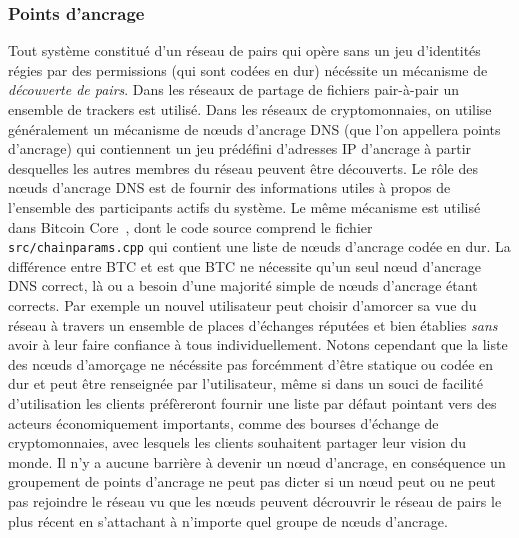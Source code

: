 \documentclass[runningheads,francais,a4paper]{llncs}
\begin{document}
\subsubsection{Points d'ancrage}
Tout système constitué d'un réseau de pairs qui opère sans un jeu d'identités régies par des permissions (qui sont
codées en dur) nécéssite un mécanisme de \emph{découverte de pairs}. Dans les réseaux de partage de fichiers pair-à-pair
un ensemble de trackers est utilisé. Dans les réseaux de cryptomonnaies, on utilise généralement un mécanisme de nœuds
d'ancrage DNS (que l'on appellera points d'ancrage) qui contiennent un jeu prédéfini d'adresses IP d'ancrage à partir
desquelles les autres membres du réseau peuvent être découverts. Le rôle des nœuds d'ancrage DNS est de fournir des
informations utiles à propos de l'ensemble des participants actifs du système. Le même mécanisme est utilisé dans
Bitcoin Core~\cite{bitcoin_2018}, dont le code source comprend le fichier \texttt{src/chainparams.cpp} qui contient
une liste de nœuds d'ancrage codée en dur. La différence entre BTC et \AVAPlatformName{} est que BTC ne nécessite
qu'un seul nœud d'ancrage DNS correct, là ou \AVAPlatformName{} a besoin d'une majorité simple de nœuds d'ancrage
étant corrects. Par exemple un nouvel utilisateur peut choisir d'amorcer sa vue du réseau à travers un ensemble
de places d'échanges réputées et bien établies \emph{sans} avoir à leur faire confiance à tous individuellement. Notons
cependant que la liste des nœuds d'amorçage ne nécéssite pas forcémment d'être statique ou codée en dur et peut être
renseignée par l'utilisateur, même si dans un souci de facilité d'utilisation les clients préfèreront fournir une liste
par défaut pointant vers des acteurs économiquement importants, comme des bourses d'échange de cryptomonnaies, avec
lesquels les clients souhaitent partager leur vision du monde. Il n'y a aucune barrière à devenir un nœud d'ancrage,
en conséquence un groupement de points d'ancrage ne peut pas dicter si un nœud peut ou ne peut pas rejoindre le
réseau vu que les nœuds peuvent décrouvrir le réseau de pairs \AVAPlatformName{} le plus récent en s'attachant à
n'importe quel groupe de nœuds d'ancrage.
\end{document}
